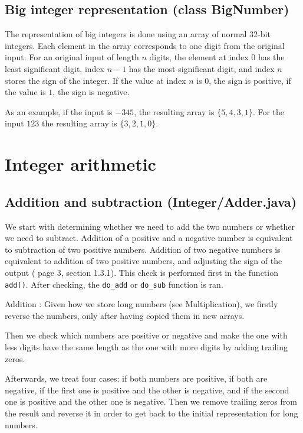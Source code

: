 \documentclass[a4paper]{article}
\begin{document}
\subsection{Big integer representation (class BigNumber)}

The representation of big integers is done using an array of normal 32-bit integers.
Each element in the array corresponds to one digit from the original input.
For an original input of length $n$ digits, the element at index $0$ has the least significant digit,
index $n-1$ has the most significant digit, and index $n$ stores the sign of the integer.
If the value at index $n$ is 0, the sign is positive, if the value is $1$, the sign is negative.

As an example, if the input is $-345$, the resulting array is $\{5, 4, 3, 1\}$.
For the input $123$ the resulting array is $\{3, 2, 1, 0\}$.


\section{Integer arithmetic}

\subsection{Addition and subtraction (Integer/Adder.java)}

We start with determining whether we need to add the two numbers or whether we need to subtract.
Addition of a positive and a negative number is equivalent to subtraction of two positive numbers.
Addition of two negative numbers is equivalent to addition of two positive numbers, and adjusting the sign of the output
(\cite{ant} page 3, section 1.3.1).
This check is performed first in the function \texttt{add()}.
After checking, the \texttt{do\_add} or \texttt{do\_sub} function is ran.

Addition : Given how we store long numbers (see Multiplication), we firstly reverse the numbers, only after having copied them in new arrays. 

Then we check which numbers are positive or negative and make the  one with less digits have the same length as the one with more digits by adding trailing zeros. 

Afterwards, we treat four cases: if both numbers are positive, if both are negative, if the first one is positive and the other is negative, and if the second one is positive and the other one is negative. Then we remove trailing zeros from the result and reverse it in order to get back to the initial representation for long numbers.
\end{document}
